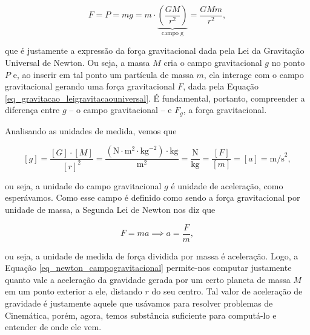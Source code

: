 $$ F = P = mg = m  \cdot \underbrace{\left(  \dfrac{GM}{r^2}\right)}_{\text{campo g}}= \dfrac{GMm}{r^2},$$

\noindent que é justamente a expressão da força gravitacional dada pela Lei da Gravitação Universal de Newton. Ou seja, a massa $M$ cria o campo gravitacional $g$ no ponto $P$ e, ao inserir em tal ponto um partícula de massa $m$, ela interage com o campo gravitacional gerando uma força gravitacional $F$, dada pela Equação \eqref{eq_gravitacao_leigravitacaouniversal}. É fundamental, portanto, compreender a diferença entre $g$ -- o campo gravitacional -- e $F_g$, a força gravitacional.





Analisando as unidades de medida, vemos que 

$$ [g] = \dfrac{[G] \cdot [M]}{[r]^{2}}   = \dfrac{(\text{N} \cdot \text{m}^2 \cdot \text{kg}^{-2}) \cdot \text{kg} }{\text{m}^{2} } = \dfrac{\text{N}}{\text{kg}} = \dfrac{[F]}{[m]} = [a] = \text{m/s}^2,$$

\noindent ou seja, a unidade do campo gravitacional $g$ é unidade de aceleração, como esperávamos. Como esse campo é definido como sendo a força gravitacional por unidade de massa, a Segunda Lei de Newton nos diz que

$$ F = ma \implies a = \dfrac{F}{m},$$

\noindent ou seja, a unidade de medida de força dividida por massa é aceleração. Logo, a Equação \eqref{eq_newton_campogravitacional} permite-nos computar justamente quanto vale a aceleração da gravidade gerada por um certo planeta de massa $M$ em um ponto exterior a ele, distando $r$ do seu centro. Tal valor de aceleração de gravidade é justamente aquele que usávamos para resolver problemas de Cinemática, porém, agora, temos substância suficiente para computá-lo e entender de onde ele vem.





\vspace{0.3cm}

